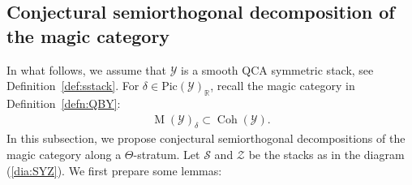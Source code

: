 \documentclass [11pt,oneside,a4paper,mathscr]{amsart}
\theoremstyle{definition}
\newcommand{\Y}{\mathcal{Y}}
\newcommand{\MM}{\operatorname{M}}
\newcommand{\Coh}{\operatorname{Coh}}
\begin{document}
\subsection{Conjectural semiorthogonal decomposition of the magic category}
In what follows, we assume that $\Y$ is a smooth QCA symmetric stack, see Definition~\ref{def:sstack}. For $\delta \in \mathrm{Pic}(\Y)_{\mathbb{R}}$, 
recall the magic category in Definition~\ref{defn:QBY}:
\begin{align*}
    \MM(\Y)_{\delta} \subset \Coh(\Y).
\end{align*}
In this subsection, we propose conjectural semiorthogonal decompositions
of the magic category along a $\Theta$-stratum. Let $\mathcal{S}$ and $\mathcal{Z}$ be 
the stacks as in the diagram (\ref{dia:SYZ}). We first prepare some lemmas: 
\end{document}
